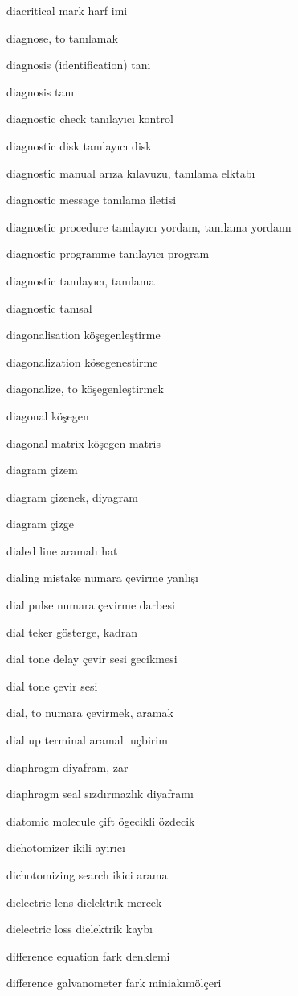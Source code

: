 \documentclass[12pt,fleqn]{article}\usepackage{../../common}
\begin{document}
diacritical mark harf imi

diagnose, to tanılamak

diagnosis (identification) tanı

diagnosis tanı

diagnostic check tanılayıcı kontrol

diagnostic disk tanılayıcı disk

diagnostic manual arıza kılavuzu, tanılama elktabı

diagnostic message tanılama iletisi

diagnostic procedure tanılayıcı yordam, tanılama yordamı

diagnostic programme tanılayıcı program

diagnostic tanılayıcı, tanılama

diagnostic tanısal

diagonalisation köşegenleştirme

diagonalization kösegenestirme

diagonalize, to köşegenleştirmek

diagonal köşegen

diagonal matrix köşegen matris

diagram çizem

diagram çizenek, diyagram

diagram çizge

dialed line aramalı hat

dialing mistake numara çevirme yanlışı

dial pulse numara çevirme darbesi

dial teker gösterge, kadran

dial tone delay çevir sesi gecikmesi

dial tone çevir sesi

dial, to numara çevirmek, aramak

dial up terminal aramalı uçbirim

diaphragm diyafram, zar

diaphragm seal sızdırmazlık diyaframı

diatomic molecule çift ögecikli özdecik

dichotomizer ikili ayırıcı

dichotomizing search ikici arama

dielectric lens dielektrik mercek

dielectric loss dielektrik kaybı

difference equation fark denklemi

difference galvanometer fark miniakımölçeri
\end{document}
